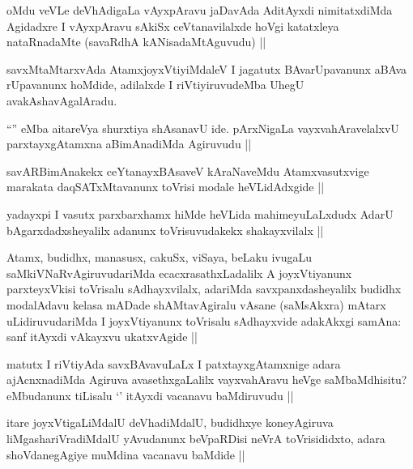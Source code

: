 \begin{artha}
oMdu veVLe deVhAdigaLa vAyxpAravu jaDavAda AditAyxdi nimitatxdiMda Agidadxre I vAyxpAravu sAkiSx ceVtanavilalxde hoVgi katatxleya nataRnadaMte (savaRdhA kANisadaMtAguvudu) ||
\end{artha}

\begin{artha}
savxMtaMtarxvAda AtamxjoyxVtiyiMdaleV I jagatutx BAvarUpavanunx aBAva rUpavanunx hoMdide, adilalxde I riVtiyiruvudeMba UhegU avakAshavAgalAradu.
\end{artha}

\begin{artha}
``\stext'' eMba aitareVya shurxtiya shAsanavU ide. pArxNigaLa vayxvahAravelalxvU parxtayxgAtamxna aBimAnadiMda Agiruvudu ||
\end{artha}

\begin{artha}
savARBimAnakekx ceYtanayxBAsaveV kAraNaveMdu Atamxvasutxvige marakata daqSATxMtavanunx toVrisi modale heVLidAdxgide ||
\end{artha}

\begin{artha}
yadayxpi I vasutx parxbarxhamx hiMde heVLida mahimeyuLaLxdudx AdarU bAgarxdadxsheyalilx adanunx toVrisuvudakekx shakayxvilalx ||
\end{artha}

\begin{artha}
Atamx, budidhx, manasusx, cakuSx, viSaya, beLaku ivugaLu saMkiVNaRvAgiruvudariMda ecacxrasathxLadalilx A joyxVtiyanunx parxteyxVkisi toVrisalu sAdhayxvilalx, adariMda savxpanxdasheyalilx budidhx modalAdavu kelasa mADade shAMtavAgiralu vAsane (saMsAkxra) mAtarx uLidiruvudariMda I joyxVtiyanunx toVrisalu sAdhayxvide adakAkxgi samAna: sanf itAyxdi vAkayxvu ukatxvAgide ||
\end{artha}

\begin{artha}
matutx I riVtiyAda savxBAvavuLaLx I patxtayxgAtamxnige adara ajAcnxnadiMda Agiruva avasethxgaLalilx vayxvahAravu heVge saMbaMdhisitu? eMbudanunx tiLisalu `\stext' itAyxdi vacanavu baMdiruvudu ||
\end{artha}

\begin{artha}
itare joyxVtigaLiMdalU deVhadiMdalU, budidhxye koneyAgiruva liMgashariVradiMdalU yAvudanunx beVpaRDisi neVrA toVrisididxto, adara shoVdanegAgiye muMdina vacanavu baMdide ||
\end{artha}

